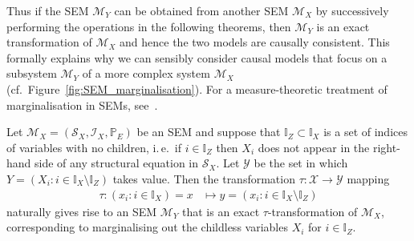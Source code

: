 Thus if the SEM $\mathcal{M}_Y$ can be obtained from another SEM $\mathcal{M}_X$ by successively performing the operations in the following theorems, then $\mathcal{M}_Y$ is an exact transformation of $\mathcal{M}_X$ and hence the two models are causally consistent.
This formally explains why we can sensibly consider causal models that focus on a subsystem $\mathcal{M}_Y$ of a more complex system $\mathcal{M}_X$ (cf.\ Figure~\ref{fig:SEM_marginalisation}).
For a measure-theoretic treatment of marginalisation in SEMs, see~\cite{bongers2016structural}.

\medskip

\begin{theorem}\label{theorem:childless}
Let $\mathcal{M}_X=(\mathcal{S}_X,\mathcal{I}_X,\mathbb{P}_E)$ be an SEM and suppose that ${\mathbb{I}_Z\subset\mathbb{I}_X}$ is a set of indices of variables with no children, i.\,e.\ if $i\in\mathbb{I}_Z$ then $X_i$ does not appear in the right-hand side of any structural equation in $\mathcal{S}_X$.
Let $\mathcal{Y}$ be the set in which $Y = \left( X_i: i\in\mathbb{I}_X\setminus \mathbb{I}_Z \right)$ takes value.
Then the transformation $\tau: \mathcal{X} \to \mathcal{Y}$ mapping
\begin{align*}
   \tau: \left( x_i: i\in\mathbb{I}_X \right) = x &\mapsto y = \left( x_i: i\in\mathbb{I}_X\setminus \mathbb{I}_Z \right)
\end{align*}
naturally gives rise to an SEM $\mathcal{M}_Y$ that is an exact $\tau$-transformation of $\mathcal{M}_X$, corresponding to marginalising out the childless variables $X_i$ for $i\in\mathbb{I}_Z$.
\end{theorem}

\medskip

